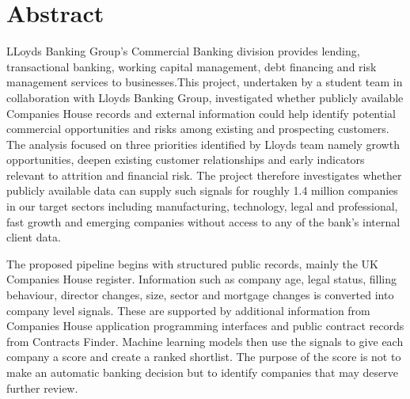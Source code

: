 \documentclass[ %
                    author={Daniel Page},
                supervisor={Dr. Andrew Calway},
                    degree={MSc},
                     title={Some Structural Guidelines for Data Science MSc Theses, Including Those With Long Titles that Run Across Multiple Lines on the Front Page},
                  subtitle={And those including an optional subtitle too, for good measure},
                      type={},
                      year={2021}]{dissertation}
\begin{document}
\frontmatter


\makedecl


\tableofcontents
\listoffigures
\listoftables
\listofalgorithms
\lstlistoflistings



\chapter*{Abstract}
LLoyds Banking Group's Commercial Banking division provides lending, transactional banking, working capital management, debt financing and risk management services to businesses.This project, undertaken by a student team in collaboration with Lloyds Banking Group, investigated whether publicly available Companies House records and external information could help identify potential commercial opportunities and risks among existing and prospecting customers. The analysis focused on three priorities identified by Lloyds team namely growth opportunities, deepen existing customer relationships and early indicators relevant to attrition and financial risk. The project therefore investigates whether publicly available data can supply such signals for roughly 1.4 million companies in our target sectors including manufacturing, technology, legal and professional, fast growth and emerging companies without access to any of the bank's internal client data. 

The proposed pipeline begins with structured public records, mainly the UK Companies House register. Information such as company age, legal status, filling behaviour, director changes, size, sector and mortgage changes is converted into company level signals. These are supported by additional information from Companies House application programming interfaces and public contract records from Contracts Finder. Machine learning models then use the signals to give each company a score and create a ranked shortlist. The purpose of the score is not to make an automatic banking decision but to identify companies that may deserve further review.
\end{document}
